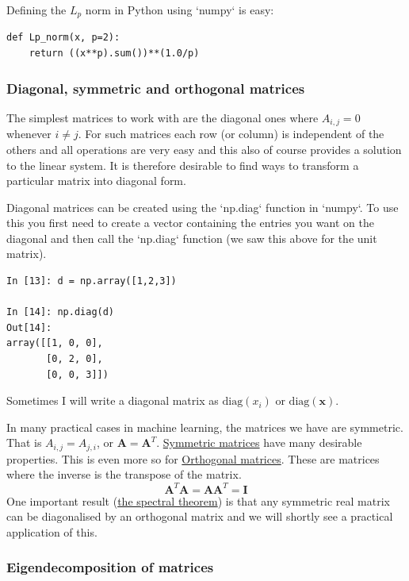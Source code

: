 \documentclass[a4paper,10pt]{article}
\begin{document}
Defining the $L_p$ norm in Python using `numpy` is easy:
\begin{lstlisting}
def Lp_norm(x, p=2):
    return ((x**p).sum())**(1.0/p)
\end{lstlisting}

\subsubsection{ Diagonal, symmetric and orthogonal matrices}

The simplest matrices to work with are the diagonal ones where $A_{i,j}=0$ whenever $i\ne j$. For such matrices each row (or column) is independent of the others and all operations are very easy and this also of course provides a solution to the linear system. It is therefore desirable to find ways to transform a particular matrix into diagonal form. 

Diagonal matrices can be created using the `np.diag` function in `numpy`. To use this you first need to create a vector containing the entries you want on the diagonal and then call the `np.diag` function (we saw this above for the unit matrix).
\begin{lstlisting}
In [13]: d = np.array([1,2,3])

In [14]: np.diag(d)
Out[14]: 
array([[1, 0, 0],
       [0, 2, 0],
       [0, 0, 3]])

\end{lstlisting}

Sometimes I will write a diagonal matrix as $\mathrm{diag}(x_i)$ or $\mathrm{diag}(\mathbf{x})$. 


In many practical cases in machine learning, the matrices we have are symmetric. That is $A_{i,j} = A_{j, i}$, or $\mathbf{A}=\mathbf{A}^T$. \href{https://en.wikipedia.org/wiki/Symmetric_matrix}{Symmetric matrices} have many desirable properties. This is even more so for \href{https://en.wikipedia.org/wiki/Orthogonal_matrix}{Orthogonal matrices}. These are matrices where the inverse is the transpose of the matrix.
$$\mathbf{A}^T \mathbf{A} = \mathbf{A}\mathbf{A}^T = \mathbf{I}$$
One important result (\href{https://en.wikipedia.org/wiki/Spectral_theorem}{the spectral theorem}) is that any symmetric real matrix can be diagonalised by an orthogonal matrix and we will shortly see a practical application of this.

\subsubsection{ Eigendecomposition of matrices}
\end{document}

